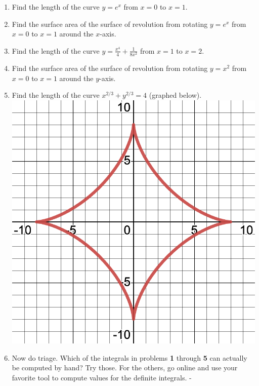 \documentclass[11pt,fleqn]{article}
\begin{document}
\begin{enumerate}
\item  Find the length of the curve {\large $y=e^x$} from $x=0$ to $x=1$.
\vfill

\item   Find the surface area of the surface of revolution from rotating {\large $y=e^x$} from $x=0$ to $x=1$ around the $x$-axis.
\vfill

\item   Find the length of the curve {\large $y=\frac{x^4}{4}+\frac{1}{8x^2}$} from $x=1$ to $x=2$.
\vfill

\clearpage
\newpage
\item  Find the surface area of the surface of revolution from rotating {\large $y=x^2$} from $x=0$ to $x=1$ around the $y$-axis.
\vfill


\item   Find the length of the curve {\large $x^{2/3}+y^{2/3}=4$} (graphed below).\\
\includegraphics[scale=0.2]{pic-2-4-a.png}
\vfill


\item   Now do triage.  Which of the integrals in problems \textbf{1} through \textbf{5} can actually be computed by hand?  Try those.   For the others, go online and use your favorite tool to compute values for the definite integrals.
-
\end{enumerate}
\end{document}
